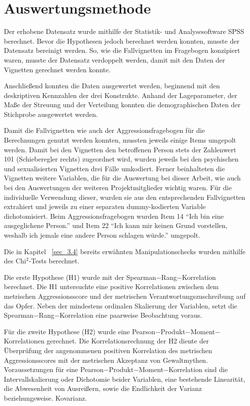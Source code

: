 \section{Auswertungsmethode}    \label{sec_3.5}
Der erhobene Datensatz wurde mithilfe der Statistik- und Analysesoftware SPSS berechnet. Bevor die Hypothesen jedoch berechnet werden konnten, musste der Datensatz bereinigt werden. So, wie die Fallvignetten im Fragebogen konzipiert waren, musste der Datensatz verdoppelt werden, damit mit den Daten der Vignetten gerechnet werden konnte. 

Anschließend konnten die Daten ausgewertet werden, beginnend mit den deskriptiven Kennzahlen der drei Konstrukte. Anhand der Lageparameter, der Maße der Streuung und der Verteilung konnten die demographischen Daten der Stichprobe ausgewertet werden.

Damit die Fallvignetten wie auch der Aggressionsfragebogen für die Berechnungen genutzt werden konnten, mussten jeweils einige Items umgepolt werden. Damit bei den Vignetten den betroffenen Person stets der Zahlenwert 101 (Schieberegler rechts) zugeordnet wird, wurden jeweils bei den psychischen und sexualisierten Vignetten drei Fälle umkodiert. Ferner beinhalteten die Vignetten weitere Variablen, die für die Auswertung bei dieser Arbeit, wie auch bei den Auswertungen der weiteren Projektmitglieder wichtig waren. Für die individuelle Verwendung dieser, wurden sie aus den entsprechenden Fallvignetten extrahiert und jeweils zu einer separaten dummy-kodierten Variable dichotomisiert. Beim Aggressionsfragebogen wurden Item 14 \enquote{Ich bin eine ausgeglichene Person.} und Item 22 \enquote{Ich kann mir keinen Grund vorstellen, weshalb ich jemals eine andere Person schlagen würde.} umgepolt.

Die in Kapitel ~\ref{sec_3.4} bereits erwähnten Manipulationschecks wurden mithilfe des Chi$^2$-Tests berechnet.

Die erste Hypothese (H1) wurde mit der Spearman$-$Rang$-$Korrelation berechnet. Die H1 untersuchte eine positive Korrelationen zwischen dem metrischen Aggressionsscore und der metrischen Verantwortungszuschreibung auf das Opfer. Neben der mindestens ordinalen Skalierung der Variablen, setzt die Spearman$-$Rang$-$Korrelation eine paarweise Beobachtung voraus.  

Für die zweite Hypothese (H2) wurde eine Pearson$-$Produkt$-$Moment$-$Korrelationen gerechnet. Die Korrelationsrechnung der H2 diente der Überprüfung der angenommenen positiven Korrelation des metrischen Aggressionsscores mit der metrischen Akzeptanz von Gewaltmythen. Voraussetzungen für eine Pearson$-$Produkt$-$Moment$-$Korrelation sind die Intervallskalierung oder Dichotomie beider Variablen, eine bestehende Linearität, die Abwesenheit von Ausreißern, sowie die Endlichkeit der Varianz beziehungsweise. Kovarianz.

